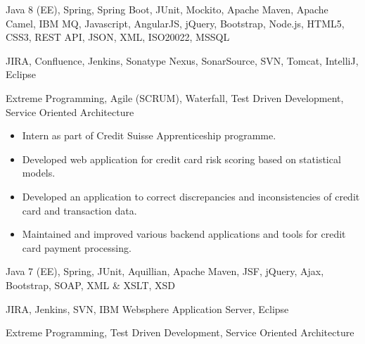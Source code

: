 \medskip
\begin{description}
	\ifincludestech
	\item [Technologies] Java 8 (EE), Spring, Spring Boot, JUnit, Mockito, Apache Maven, Apache Camel, IBM MQ, Javascript, AngularJS, jQuery, Bootstrap, Node.js, HTML5, CSS3, REST API, JSON, XML, ISO20022, MSSQL
	\fi
	\ifincludestools
	\item [Tools] JIRA, Confluence, Jenkins, Sonatype Nexus, SonarSource, SVN, Tomcat, IntelliJ, Eclipse
	\fi
	\ifincludesmethods
	\item [Methodologies] Extreme Programming, Agile (SCRUM), Waterfall, Test Driven Development, Service Oriented Architecture
	\fi
\end{description}

\divider


\medskip
\begin{itemize}
	\item Intern as part of Credit Suisse Apprenticeship programme.
	\item Developed web application for credit card risk scoring based on statistical models.
	\item Developed an application to correct discrepancies and inconsistencies of credit card and transaction data.
	\item Maintained and improved various backend applications and tools for credit card payment processing.
\end{itemize}

\medskip
\begin{description}
	\ifincludestech
	\item [Technologies] Java 7 (EE), Spring, JUnit, Aquillian, Apache Maven, JSF, jQuery, Ajax, Bootstrap, SOAP, XML \& XSLT, XSD
	\fi
	\ifincludestools
	\item [Tools] JIRA, Jenkins, SVN, IBM Websphere Application Server, Eclipse
	\fi
	\ifincludesmethods
	\item [Methodologies] Extreme Programming, Test Driven Development, Service Oriented Architecture
	\fi
\end{description}

\divider


